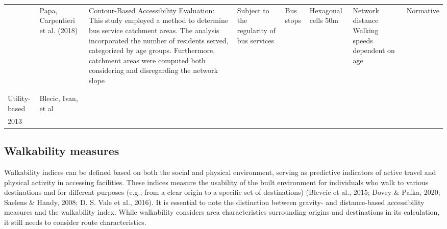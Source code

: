 \documentclass[
11pt, %
oneside, %
english, %
singlespacing, %
]{macthesis} %
\begin{document}
\begin{landscape}
\begin{table}
{\begin{tabular}[t]{l>{\raggedright\arraybackslash}p{5cm}>{\raggedright\arraybackslash}p{5cm}>{\raggedright\arraybackslash}p{5cm}>{\raggedright\arraybackslash}p{5cm}>{\raggedright\arraybackslash}p{5cm}ll}
 & Papa, Carpentieri et al. (2018) & Contour-Based Accessibility Evaluation: This study employed a method to determine bus service catchment areas. The analysis incorporated the number of residents served, categorized by age groups. Furthermore, catchment areas were computed both considering and disregarding the network slope & Subject to the regularity of bus services & Bus stops & Hexagonal cells 50m & Network distance Walking speeds dependent on age & Normative\\
 &  &  &  &  &  &  \vphantom{1} & \\
\addlinespace
 &  &  &  &  &  &  & \\
Utility-based & Blecic, Ivan, et al &  &  &  &  &  & \\
2013 &  &  &  &  &  &  & \\
\bottomrule
\end{tabular}}
\end{table}
\end{landscape}

\subsection{Walkability measures}\label{walkability-measures}

Walkability indices can be defined based on both the social and physical environment, serving as predictive indicators of active travel and physical activity in accessing facilities. These indices measure the usability of the built environment for individuals who walk to various destinations and for different purposes (e.g., from a clear origin to a specific set of destinations) (Blevcic et al., 2015; Dovey \& Pafka, 2020; Saelens \& Handy, 2008; D. S. Vale et al., 2016). It is essential to note the distinction between gravity- and distance-based accessibility measures and the walkability index. While walkability considers area characteristics surrounding origins and destinations in its calculation, it still needs to consider route characteristics.
\end{document}
